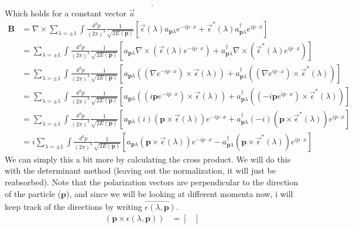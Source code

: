 \documentclass[working, oneside]{../../../Preambles/tuftebook}
\begin{document}
\begin{solution}
\begin{align*}
.\end{align*}
Which holds for a constant vector $\vec{a}$
\begin{align*}
\mathbf{B} &= \nabla \times \sum_{\lambda = \pm 1}\int\frac{d^3p}{(2\pi)^3}\frac{1}{\sqrt{2E(\bm p)}}\left[\vec{\epsilon}(\lambda)a_{\bm p\lambda}e^{-ip\cdot x}+\vec{\epsilon}^*(\lambda)a_{\bm p\lambda}^{\dagger}e^{ip\cdot x} \right] \\
&= \sum_{\lambda = \pm 1}\int\frac{d^3p}{(2\pi)^3}\frac{1}{\sqrt{2E(\bm p)}}\left[a_{\bm p\lambda}\nabla \times \left( \vec{\epsilon}(\lambda) e^{-ip\cdot x}\right)+a_{\bm p\lambda}^{\dagger}\nabla \times \left( \vec{\epsilon}^*(\lambda) e^{ip\cdot x} \right)\right] \\
&= \sum_{\lambda = \pm 1}\int\frac{d^3p}{(2\pi)^3}\frac{1}{\sqrt{2E(\bm p)}}\left[a_{\bm p\lambda} \left( (\nabla e^{-ip\cdot x}) \times \vec{\epsilon}(\lambda) \right)+a_{\bm p\lambda}^{\dagger}\left( (\nabla e^{ip\cdot x}) \times \vec{\epsilon}^*(\lambda) \right)\right] \\
&= \sum_{\lambda = \pm 1}\int\frac{d^3p}{(2\pi)^3}\frac{1}{\sqrt{2E(\bm p)}}\left[a_{\bm p\lambda} \left( (i \mathbf{p} e^{-ip\cdot x}) \times \vec{\epsilon}(\lambda) \right)+a_{\bm p\lambda}^{\dagger}\left( (-i\mathbf{p} e^{ip\cdot x}) \times \vec{\epsilon}^*(\lambda) \right)\right] \\
&= \sum_{\lambda = \pm 1}\int\frac{d^3p}{(2\pi)^3}\frac{1}{\sqrt{2E(\bm p)}}\left[a_{\bm p\lambda} (i) (\mathbf{p} \times \vec{\epsilon}(\lambda)) e^{-ip\cdot x}+a_{\bm p\lambda}^{\dagger} (-i) (\mathbf{p} \times \vec{\epsilon}^*(\lambda)) e^{ip\cdot x} \right] \\
&= i\sum_{\lambda = \pm 1}\int\frac{d^3p}{(2\pi)^3}\frac{1}{\sqrt{2E(\bm p)}}\left[a_{\bm p\lambda} (\mathbf{p} \times \vec{\epsilon}(\lambda)) e^{-ip\cdot x}-a_{\bm p\lambda}^{\dagger}(\mathbf{p} \times \vec{\epsilon}^*(\lambda)) e^{ip\cdot x} \right]
\end{align*}
We can simply this a bit more by calculating the cross product. We will do this with the determinant method (leaving out the normalization, it will just be reabsorbed). Note that the polarization vectors are perpendicular to the direction of the particle ($\mathbf{p}$), and since we will be looking at different momenta now, i will keep track of the directions by writing $\vec{\epsilon\left( \lambda, \mathbf{p} \right) }$.
\begin{align*}
    \left( \mathbf{p}\times \epsilon\left( \lambda, \mathbf{p} \right)  \right) &=
\begin{bmatrix}

\end{bmatrix}
\end{align*}
\end{solution}
\end{document}
